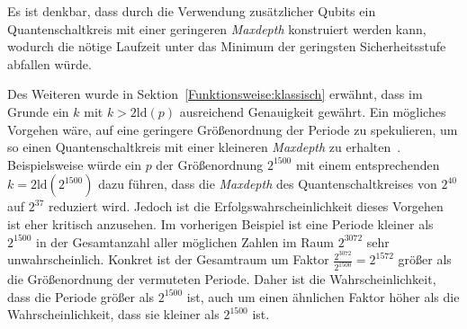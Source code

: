 \vspace{1em}

 

Es ist denkbar, dass durch die Verwendung zusätzlicher Qubits ein Quantenschaltkreis mit einer geringeren \textit{Maxdepth} konstruiert werden kann, 
wodurch die nötige Laufzeit unter das Minimum der geringsten Sicherheitsstufe abfallen würde.

Des Weiteren wurde in Sektion~\ref{Funktionsweise:klassisch} erwähnt, 
dass im Grunde ein \(k\) mit \(k > 2\text{ld}(p)\) ausreichend Genauigkeit gewährt. 
Ein mögliches Vorgehen wäre, 
auf eine geringere Größenordnung der Periode zu spekulieren, 
um so einen Quantenschaltkreis mit einer kleineren \textit{Maxdepth} zu erhalten~\cite{Shor_1997}. 
Beispielsweise würde ein \(p\) der Größenordnung \(2^{1500}\) mit einem entsprechenden \(k = 2\text{ld}(2^{1500})\) dazu führen, 
dass die \textit{Maxdepth} des Quantenschaltkreises von \(2^{40}\) auf \(2^{37}\) reduziert wird. 
Jedoch ist die Erfolgswahrscheinlichkeit dieses Vorgehen ist eher kritisch anzusehen. 
Im vorherigen Beispiel ist eine Periode kleiner als \(2^{1500}\) in der Gesamtanzahl aller möglichen Zahlen im Raum \(2^{3072}\) sehr unwahrscheinlich. 
Konkret ist der Gesamtraum um Faktor \(\frac{2^{3072}}{2^{1500}} = 2^{1572}\) größer als die Größenordnung der vermuteten Periode.  
Daher ist die Wahrscheinlichkeit, 
dass die Periode größer als \(2^{1500}\) ist, 
auch um einen ähnlichen Faktor höher als die Wahrscheinlichkeit, dass sie kleiner als \(2^{1500}\) ist.




